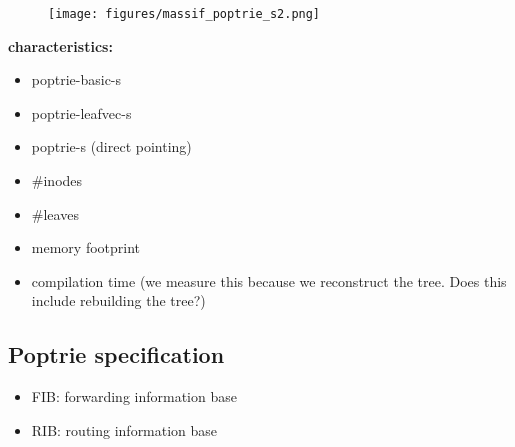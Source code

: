 \documentclass{article}
\begin{document}
\begin{figure}
\begin{center}
    \texttt{[image: figures/massif\_poptrie\_s2.png]}
\end{center}
\end{figure}
\textbf{characteristics:}
\begin{itemize}
    \item poptrie-basic-s
    \item poptrie-leafvec-s
    \item poptrie-s (direct pointing)
    \item \#inodes
    \item \#leaves
    \item memory footprint
    \item compilation time (we measure this because
    we reconstruct the tree. Does this include rebuilding the tree?)
\end{itemize}

\subsection{Poptrie specification}
\begin{itemize}
    \item FIB: forwarding information base
    \item RIB: routing information base
\end{itemize}
\end{document}
